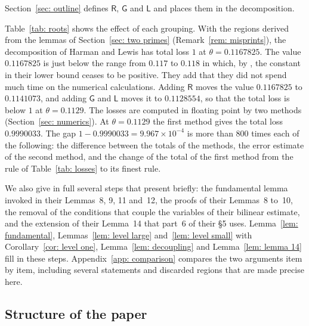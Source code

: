 \documentclass{article}
\numberwithin{equation}{section}
\begin{document}
Section~\ref{sec: outline} defines $\mathsf{R}$, $\mathsf{G}$ and $\mathsf{L}$ and places them in the decomposition.

Table~\ref{tab: roots} shows the effect of each grouping. With the regions derived from the lemmas of Section~\ref{sec: two primes} (Remark~\ref{rem: misprints}), the decomposition of Harman and Lewis has total loss $1$ at $\theta = 0.1167825$. The value $0.1167825$ is just below the range from $0.117$ to $0.118$ in which, by \citet[p.~134]{harman2001gaussian}, the constant in their lower bound ceases to be positive. They add that they did not spend much time on the numerical calculations. Adding $\mathsf{R}$ moves the value $0.1167825$ to $0.1141073$, and adding $\mathsf{G}$ and $\mathsf{L}$ moves it to $0.1128554$, so that the total loss is below $1$ at $\theta = 0.1129$. The losses are computed in floating point by two methods (Section~\ref{sec: numerics}). At $\theta = 0.1129$ the first method gives the total loss $0.9990033$. The gap $1 - 0.9990033 = 9.967 \times 10^{-4}$ is more than $800$ times each of the following: the difference between the totals of the methods, the error estimate of the second method, and the change of the total of the first method from the rule of Table~\ref{tab: losses} to its finest rule.

We also give in full several steps that \citet{harman2001gaussian} present briefly: the fundamental lemma invoked in their Lemmas~8, 9, 11 and~12, the proofs of their Lemmas~8 to~10, the removal of the conditions that couple the variables of their bilinear estimate, and the extension of their Lemma~14 that part~6 of their \S5 uses. Lemma~\ref{lem: fundamental}, Lemmas~\ref{lem: level large} and~\ref{lem: level small} with Corollary~\ref{cor: level one}, Lemma~\ref{lem: decoupling} and Lemma~\ref{lem: lemma 14} fill in these steps. Appendix~\ref{app: comparison} compares the two arguments item by item, including several statements and discarded regions that are made precise here.

\subsection{Structure of the paper}
\label{subsec: structure}
\end{document}
